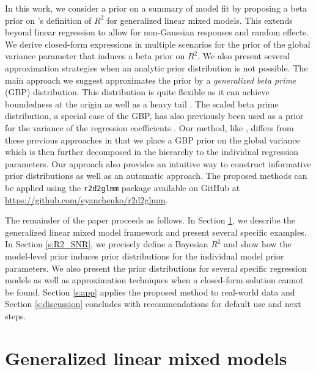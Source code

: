 \documentclass[12pt]{article}
\begin{document}
In this work, we consider a prior on a summary of model fit by proposing a beta prior on \cite{zhang2022bayesian}'s definition of $R^2$ for generalized linear mixed models. This extends \cite{zhang2022bayesian} beyond linear regression to allow for non-Gaussian responses and random effects. We derive closed-form expressions in multiple scenarios for the prior of the global variance parameter that induces a beta prior on $R^2$. We also present several approximation strategies when an analytic prior distribution is not possible. The main approach we suggest approximates the prior by a {\it generalized beta prime} (GBP) distribution. This distribution is quite flexible as it can achieve boundedness at the origin as well as a heavy tail \citep{Perez::2007aa}. The scaled beta prime distribution, a special case of the GBP, has also previously been used as a prior for the variance of the regression coefficients \citep{klein2021bayesian, Bai::2021aa}. Our method, like \cite{zhang2022bayesian}, differs from these previous approaches in that we place a GBP prior on the global variance which is then further decomposed in the hierarchy to the individual regression parameters. Our approach also provides an intuitive way to construct informative prior distributions as well as an automatic approach. The proposed methods can be applied using the {\tt r2d2glmm} package available on GitHub at \url{https://github.com/eyanchenko/r2d2glmm}.


The remainder of the paper proceeds as follows.
In Section \ref{s:glmm}, we describe the generalized linear mixed model framework and present several specific examples. In Section \ref{s:R2_SNR}, we precisely define a Bayesian $R^2$ and show how the model-level prior induces prior distributions for the individual model prior parameters. We also present the prior distributions for several specific regression models as well as approximation techniques when a closed-form solution cannot be found. Section \ref{s:app} applies the proposed method to real-world data and Section \ref{s:discussion} concludes with recommendations for default use and next steps.



\section{Generalized linear mixed models}\label{s:glmm}
\end{document}
